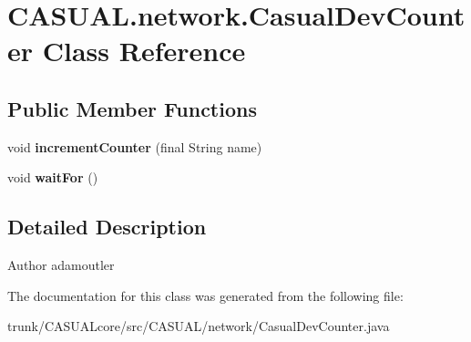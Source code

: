 \hypertarget{classCASUAL_1_1network_1_1CasualDevCounter}{\section{C\-A\-S\-U\-A\-L.\-network.\-Casual\-Dev\-Counter Class Reference}
\label{classCASUAL_1_1network_1_1CasualDevCounter}
}
\subsection*{Public Member Functions}
\begin{DoxyCompactItemize}
\item 
\hypertarget{classCASUAL_1_1network_1_1CasualDevCounter_a483d0b6fdc826a0d4960a4ab67d29d12}{void {\bfseries increment\-Counter} (final String name)}\label{classCASUAL_1_1network_1_1CasualDevCounter_a483d0b6fdc826a0d4960a4ab67d29d12}

\item 
\hypertarget{classCASUAL_1_1network_1_1CasualDevCounter_a0985f7f6f1d1b36535c632e42a581f75}{void {\bfseries wait\-For} ()}\label{classCASUAL_1_1network_1_1CasualDevCounter_a0985f7f6f1d1b36535c632e42a581f75}

\end{DoxyCompactItemize}


\subsection{Detailed Description}
\begin{DoxyAuthor}{Author}
adamoutler 
\end{DoxyAuthor}


The documentation for this class was generated from the following file\-:\begin{DoxyCompactItemize}
\item 
trunk/\-C\-A\-S\-U\-A\-Lcore/src/\-C\-A\-S\-U\-A\-L/network/Casual\-Dev\-Counter.\-java\end{DoxyCompactItemize}
